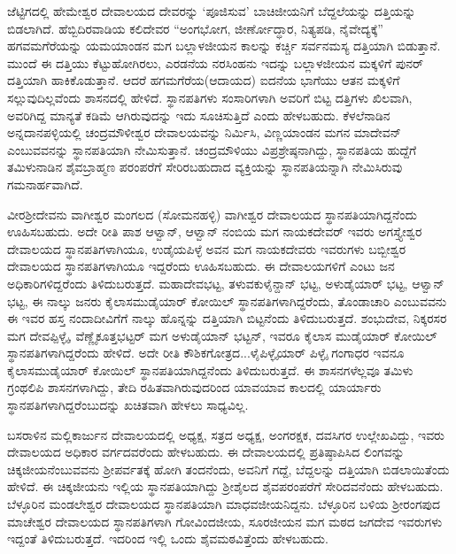 ಜೆಟ್ಟಿಗದಲ್ಲಿ ಹೇಮೇಶ್ವರ ದೇವಾಲಯದ ದೇವರನ್ನು ‘ಪೂಜಿಸುವ’ ಬಾಚಿಜೀಯನಿಗೆ ಬೆದ್ದಲೆಯನ್ನು ದತ್ತಿಯನ್ನು ಬಿಡಲಾಗಿದೆ. ಹೆಬ್ಬಿದಿರವಾಡಿಯ ಕಲಿದೇವರ “ಅಂಗಭೋಗ, ಜೀರ್ಣೋದ್ಧಾರ, ನಿತ್ಯಪಡಿ, ನೈವೇದ್ಯಕ್ಕೆ” ಹಗವಮಗೆರೆಯನ್ನು ಯಮಯಾಂಡನ ಮಗ ಬಲ್ಲಾಳಜೀಯನ ಕಾಲನ್ನು ಕರ್ಚ್ಚಿ ಸರ್ವನಮಸ್ಯ ದತ್ತಿಯಾಗಿ ಬಿಡುತ್ತಾನೆ. ಮುಂದೆ ಈ ದತ್ತಿಯು ಕೆಟ್ಟುಹೋಗಿರಲು, ಎರಡನೆಯ ನರಸಿಂಹನು ಇದನ್ನು ಬಲ್ಲಾಳಜೀಯನ ಮಕ್ಕಳಿಗೆ ಪುನರ್​ ದತ್ತಿಯಾಗಿ ಹಾಕಿಕೊಡುತ್ತಾನೆ. ಆದರೆ ಹಗಮಗೆರೆಯ(ಆದಾಯದ) ಐದನೆಯ ಭಾಗೆಯು ಆತನ ಮಕ್ಕಳಿಗೆ ಸಲ್ಲುವುದಿಲ್ಲವೆಂದು ಶಾಸನದಲ್ಲಿ ಹೇಳಿದೆ. ಸ್ಥಾನಪತಿಗಳು ಸಂಸಾರಿಗಳಾಗಿ ಅವರಿಗೆ ಬಿಟ್ಟ ದತ್ತಿಗಳು ಖಿಲವಾಗಿ, ಅವರಿಗಿದ್ದ ಮಾನ್ಯತೆ ಕಡಿಮೆ ಆಗಿರುವುದನ್ನು ಇದು ಸೂಚಿಸುತ್ತಿದೆ ಎಂದು ಹೇಳಬಹುದು. ಕೆಳಲೆನಾಡಿನ ಅನ್ನದಾನಪಳ್ಳಿಯಲ್ಲಿ ಚಂದ್ರಮೌಳೀಶ್ವರ ದೇವಾಲಯವನ್ನು ನಿರ್ಮಿಸಿ, ವಿಣ್ಣಯಾಂಡನ ಮಗನ ಮಾದೇವನ್​ ಎಂಬುವವನನ್ನು ಸ್ಥಾನಪತಿಯಾಗಿ ನೇಮಿಸುತ್ತಾನೆ. ಚಂದ್ರಮೌಳಿಯು ವಿಪ್ರಶ್ರೇಷ್ಠನಾಗಿದ್ದು, ಸ್ಥಾನಪತಿಯ ಹುದ್ದೆಗೆ ತಮಿಳುನಾಡಿನ ಶೈವಬ್ರಾಹ್ಮಣ ಪರಂಪರೆಗೆ ಸೇರಿರಬಹುದಾದ ವ್ಯಕ್ತಿಯನ್ನು ಸ್ಥಾನಪತಿಯನ್ನಾಗಿ ನೇಮಿಸಿರುವು ಗಮನಾರ್ಹವಾಗಿದೆ.

ವೀರಶ‍್ರೀದೇವನು ವಾಗೀಶ್ವರ ಮಂಗಲದ (ಸೋಮನಹಳ್ಳಿ) ವಾಗೀಶ್ವರ ದೇವಾಲಯದ ಸ್ಥಾನಪತಿಯಾಗಿದ್ದನೆಂದು ಊಹಿಸಬಹುದು. ಅದೇ ರೀತಿ ಪಾಶ ಆಳ್ವಾನ್​, ಆಳ್ವಾನ್​ ನಂಬಿಯ ಮಗ ನಾಯಕದೇವರ್​ ಇವರು ಅಗಸ್ತ್ಯೇಶ್ವರ ದೇವಾಲಯದ ಸ್ಥಾನಪತಿಗಳಾಗಿಯೂ, ಉಡೈಯಪಿಳ್ಳೆ ಅವನ ಮಗ ನಾಯಕದೇವರು ಇವರುಗಳು ಬಬ್ಬೀಶ್ವರ ದೇವಾಲಯದ ಸ್ಥಾನಪತಿಗಳಾಗಿಯೂ ಇದ್ದರೆಂದು ಊಹಿಸಬಹುದು. ಈ ದೇವಾಲಯಗಳಿಗೆ ಎಂಟು ಜನ ಅಧಿಕಾರಿಗಳಿದ್ದರೆಂದು ತಿಳಿದುಬರುತ್ತದೆ. ಮಹಾದೇವಭಟ್ಟ, ತಳುವಕುಳೈನ್ದಾನ್​ ಭಟ್ಟ, ಅಳುಡೈಯಾರ್​ ಭಟ್ಟ, ಆಳ್ವಾನ್​ ಭಟ್ಟ, ಈ ನಾಲ್ಕು ಜನರು ಕೈಲಾಸಮುಡೈಯಾರ್​ ಕೋಯಿಲ್​ ಸ್ಥಾನಪತಿಗಳಾಗಿದ್ದರೆಂದು, ತೊಂಡಾಚಾರಿ ಎಂಬುವವನು ಈ ಇವರ ಹಸ್ತ ನಂದಾದೀವಿಗೆಗೆ ನಾಲ್ಕು ಹೊನ್ನನ್ನು ದತ್ತಿಯಾಗಿ ಬಿಟ್ಟನೆಂದು ತಿಳಿದುಬರುತ್ತದೆ. ಶಂಭುದೇವ, ನಿಕ್ಕರಸರ ಮಗ ದೇವಪ್ಪಿಳ್ಳೈ, ವೆಣ್ಣೈಕೂತ್ತಭಟ್ಟರ್​ ಮಗ ಅಳುಡೈಯಾನ್​ ಭಟ್ಟನ್​, ಇವರೂ ಕೈಲಾಸ ಮುಡೈಯಾರ್​ ಕೋಯಿಲ್​ ಸ್ಥಾನಪತಿಗಳಾಗಿದ್ದರೆಂದು ಹೇಳಿದೆ. ಅದೇ ರೀತಿ ಕೌಶಿಕಗೋತ್ರದ...ಳೈಪಿಳ್ಳೈಯಾರ್​ ಪಿಳ್ಳೈ ಗಂಗಾಧರ ಇವನೂ ಕೈಲಾಸಮುಡೈಯಾರ್​ ಕೋಯಿಲ್​ ಸ್ಥಾನಪತಿಯಾಗಿದ್ದನೆಂದು ತಿಳಿದುಬರುತ್ತದೆ. ಈ ಶಾಸನಗಳೆಲ್ಲವೂ ತಮಿಳು ಗ್ರಂಥಲಿಪಿ ಶಾಸನಗಳಾಗಿದ್ದು, ತೇದಿ ರಹಿತವಾಗಿರುವುದರಿಂದ ಯಾವಯಾವ ಕಾಲದಲ್ಲಿ ಯಾರ್ಯಾರು ಸ್ಥಾನಪತಿಗಳಾಗಿದ್ದರೆಂಬುದನ್ನು ಖಚಿತವಾಗಿ ಹೇಳಲು ಸಾಧ್ಯವಿಲ್ಲ.

ಬಸರಾಳಿನ ಮಲ್ಲಿಕಾರ್ಜುನ ದೇವಾಲಯದಲ್ಲಿ ಅಧ್ಯಕ್ಷ, ಸತ್ರದ ಅಧ್ಯಕ್ಷ, ಅಂಗರಕ್ಷಕ, ದವಸಿಗರ ಉಲ್ಲೇಖವಿದ್ದು, ಇವರು ದೇವಾಲಯದ ಅಧಿಕಾರ ವರ್ಗದವರೆಂದು ಹೇಳಬಹುದು. ಈ ದೇವಾಲಯದಲ್ಲಿ ಪ್ರತಿಷ್ಠಾಪಿಸಿದ ಲಿಂಗವನ್ನು ಚಿಕ್ಕಜೀಯನೆಂಬುವವನು ಶ‍್ರೀಪರ್ವತಕ್ಕೆ ಹೋಗಿ ತಂದನೆಂದು, ಅವನಿಗೆ ಗದ್ದೆ, ಬೆದ್ದಲನ್ನು ದತ್ತಿಯಾಗಿ ಬಿಡಲಾಯಿತೆಂದು ಹೇಳಿದೆ. ಈ ಚಿಕ್ಕಜೀಯನು ಇಲ್ಲಿಯ ಸ್ಥಾನಪತಿಯಾಗಿದ್ದು ಶ‍್ರೀಶೈಲದ ಶೈವಪರಂಪರೆಗೆ ಸೇರಿದವನೆಂದು ಹೇಳಬಹುದು. ಬೆಳ್ಳೂರಿನ ಮಂಡಲೇಶ್ವರ ದೇವಾಲಯದ ಸ್ಥಾನಪತಿಯಾಗಿ ಮಾಧವಜೀಯನಿದ್ದನು. ಬೆಳ್ಳೂರಿನ ಬಳಿಯ ಶ‍್ರೀರಂಗಪುದ ಮಾಚೇಶ್ವರ ದೇವಾಲಯದ ಸ್ಥಾನಪತಿಗಳಾಗಿ ಗೋವಿಂದಜೀಯ, ಸೂರಜೀಯನ ಮಗ ಮಠದ ಜಗದೇವ ಇವರುಗಳು ಇದ್ದಂತೆ ತಿಳಿದುಬರುತ್ತದೆ. ಇದರಿಂದ ಇಲ್ಲಿ ಒಂದು ಶೈವಮಠವಿತ್ತೆಂದು ಹೇಳಬಹುದು.


